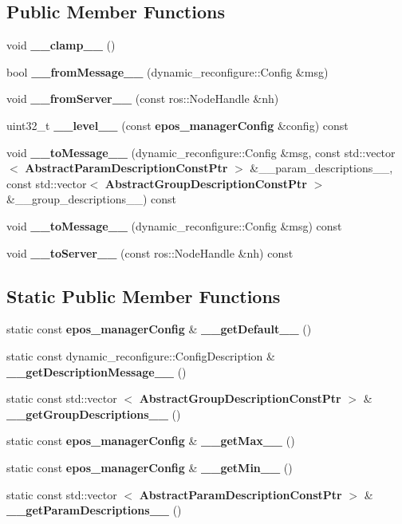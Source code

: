 \subsection*{\-Public \-Member \-Functions}
\begin{DoxyCompactItemize}
\item 
void {\bf \-\_\-\-\_\-clamp\-\_\-\-\_\-} ()
\item 
bool {\bf \-\_\-\-\_\-from\-Message\-\_\-\-\_\-} (dynamic\-\_\-reconfigure\-::\-Config \&msg)
\item 
void {\bf \-\_\-\-\_\-from\-Server\-\_\-\-\_\-} (const ros\-::\-Node\-Handle \&nh)
\item 
uint32\-\_\-t {\bf \-\_\-\-\_\-level\-\_\-\-\_\-} (const {\bf epos\-\_\-manager\-Config} \&config) const 
\item 
void {\bf \-\_\-\-\_\-to\-Message\-\_\-\-\_\-} (dynamic\-\_\-reconfigure\-::\-Config \&msg, const std\-::vector$<$ {\bf \-Abstract\-Param\-Description\-Const\-Ptr} $>$ \&\-\_\-\-\_\-param\-\_\-descriptions\-\_\-\-\_\-, const std\-::vector$<$ {\bf \-Abstract\-Group\-Description\-Const\-Ptr} $>$ \&\-\_\-\-\_\-group\-\_\-descriptions\-\_\-\-\_\-) const 
\item 
void {\bf \-\_\-\-\_\-to\-Message\-\_\-\-\_\-} (dynamic\-\_\-reconfigure\-::\-Config \&msg) const 
\item 
void {\bf \-\_\-\-\_\-to\-Server\-\_\-\-\_\-} (const ros\-::\-Node\-Handle \&nh) const 
\end{DoxyCompactItemize}
\subsection*{\-Static \-Public \-Member \-Functions}
\begin{DoxyCompactItemize}
\item 
static const {\bf epos\-\_\-manager\-Config} \& {\bf \-\_\-\-\_\-get\-Default\-\_\-\-\_\-} ()
\item 
static const \*
dynamic\-\_\-reconfigure\-::\-Config\-Description \& {\bf \-\_\-\-\_\-get\-Description\-Message\-\_\-\-\_\-} ()
\item 
static const std\-::vector\*
$<$ {\bf \-Abstract\-Group\-Description\-Const\-Ptr} $>$ \& {\bf \-\_\-\-\_\-get\-Group\-Descriptions\-\_\-\-\_\-} ()
\item 
static const {\bf epos\-\_\-manager\-Config} \& {\bf \-\_\-\-\_\-get\-Max\-\_\-\-\_\-} ()
\item 
static const {\bf epos\-\_\-manager\-Config} \& {\bf \-\_\-\-\_\-get\-Min\-\_\-\-\_\-} ()
\item 
static const std\-::vector\*
$<$ {\bf \-Abstract\-Param\-Description\-Const\-Ptr} $>$ \& {\bf \-\_\-\-\_\-get\-Param\-Descriptions\-\_\-\-\_\-} ()
\end{DoxyCompactItemize}
